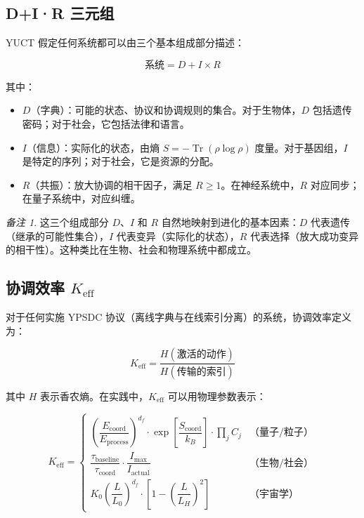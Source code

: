 \documentclass[12pt,a4paper]{article}
\theoremstyle{remark}
\newtheorem{remark}[theorem]{备注}
\newcommand{\Keff}{K_{\mathrm{eff}}}
\newcommand{\df}{d_{\!f}}
\DeclareMathOperator{\Tr}{Tr}
\begin{document}
	\subsection{D+I·R 三元组}
	
	YUCT 假定任何系统都可以由三个基本组成部分描述：
	
	\begin{equation}
		\text{系统} = D + I \times R
		\label{eq:triad}
	\end{equation}
	
	其中：
	\begin{itemize}
		\item $D$（字典）：可能的状态、协议和协调规则的集合。对于生物体，$D$ 包括遗传密码；对于社会，它包括法律和语言。
		\item $I$（信息）：实际化的状态，由熵 $S = -\Tr(\rho \log \rho)$ 度量。对于基因组，$I$ 是特定的序列；对于社会，它是资源的分配。
		\item $R$（共振）：放大协调的相干因子，满足 $R \geq 1$。在神经系统中，$R$ 对应同步；在量子系统中，对应纠缠。
	\end{itemize}
	
	\begin{remark}
		这三个组成部分 $D$、$I$ 和 $R$ 自然地映射到进化的基本因素：$D$ 代表遗传（继承的可能性集合），$I$ 代表变异（实际化的状态），$R$ 代表选择（放大成功变异的相干性）。这种类比在生物、社会和物理系统中都成立。
	\end{remark}
	
	\subsection{协调效率 $\Keff$}
	
	对于任何实施 YPSDC 协议（离线字典与在线索引分离）的系统，协调效率定义为：
	
	\begin{equation}
		\Keff = \frac{H(\text{激活的动作})}{H(\text{传输的索引})}
		\label{eq:keff-def}
	\end{equation}
	
	其中 $H$ 表示香农熵。在实践中，$\Keff$ 可以用物理参数表示：
	
	\begin{equation}
		\Keff = 
		\begin{cases}
			\left(\dfrac{E_{\text{coord}}}{E_{\text{process}}}\right)^{\df} \cdot \exp\left[\dfrac{S_{\text{coord}}}{k_B}\right] \cdot \prod_j C_j & \text{（量子/粒子）} \\[1em]
			\dfrac{\tau_{\text{baseline}}}{\tau_{\text{coord}}} \cdot \dfrac{I_{\text{max}}}{I_{\text{actual}}} & \text{（生物/社会）} \\[1em]
			K_0 \left(\dfrac{L}{L_0}\right)^{\df} \cdot \left[1 - \left(\dfrac{L}{L_H}\right)^2\right] & \text{（宇宙学）}
		\end{cases}
		\label{eq:keff-cases}
	\end{equation}
	
\end{document}
